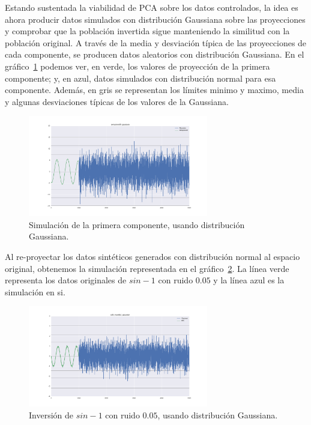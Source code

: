 \documentclass[11pt,spanish,listoffigures,listoftables]{tfgetsinf}
\begin{document}
    Estando sustentada la viabilidad de PCA sobre los datos controlados, la idea es ahora producir datos simulados con distribución Gaussiana sobre las proyecciones y comprobar que la población invertida sigue manteniendo la similitud con la población original. A través de la media y desviación típica de las proyecciones de cada componente, se producen datos aleatorios con distribución Gaussiana. En el gráfico~\ref{fig:component_1_gaussian} podemos ver, en verde, los valores de proyección de la primera componente; y, en azul, datos simulados con distribución normal para esa componente. Además, en gris se representan los límites minimo y maximo, media y algunas desviaciones típicas de los valores de la Gaussiana.

    \begin{figure}[H]
        \centering
        \includegraphics[width=0.7\textwidth]{component0_gaussian.png}
        \caption{Simulación de la primera componente, usando distribución Gaussiana.}
        \label{fig:component_1_gaussian}
    \end{figure}
    
    Al re-proyectar los datos sintéticos generados con distribución normal al espacio original, obtenemos la simulación representada en el gráfico~\ref{fig:col5_inverted_gaussian}. La línea verde representa los datos originales de \(sin - 1\) con ruido \(0.05\) y la línea azul es la simulación en si. 
     
    \begin{figure}[H]
        \centering
        \includegraphics[width=0.7\textwidth]{col5_inverted_gaussian}
        \caption{Inversión de \(sin - 1\) con ruido \(0.05\), usando distribución Gaussiana.}
        \label{fig:col5_inverted_gaussian}
    \end{figure}
    
\end{document}
